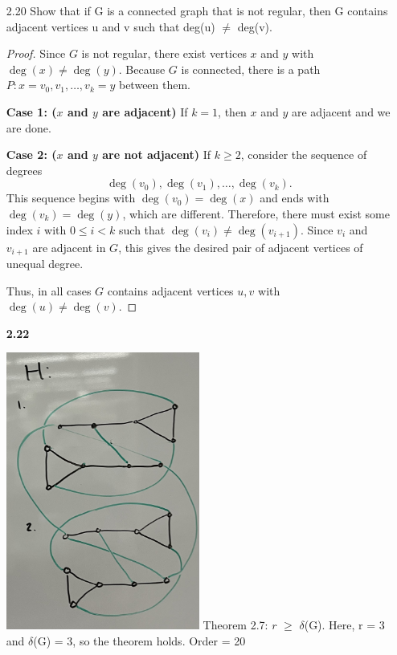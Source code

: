 \documentclass[12pt]{article}
\begin{document}
\begin{enumerate}
\item[2.20]  Show that if G is a connected graph that is not regular, then G contains adjacent vertices
 u and v such that deg(u) $\neq$ deg(v).
\begin{proof}
Since $G$ is not regular, there exist vertices $x$ and $y$ with $\deg(x) \neq \deg(y)$.
Because $G$ is connected, there is a path $P : x=v_0,v_1,\dots,v_k=y$ between them. 

\textbf{Case 1: ($x$ and $y$ are adjacent)} If $k=1$, then $x$ and $y$ are adjacent and we are done. 


\textbf{Case 2: ($x$ and $y$ are not adjacent)} If $k \geq 2$, consider the sequence of degrees
\[
\deg(v_0), \deg(v_1), \dots, \deg(v_k).
\]
This sequence begins with $\deg(v_0)=\deg(x)$ and ends with $\deg(v_k)=\deg(y)$, which are different. 
Therefore, there must exist some index $i$ with $0 \leq i < k$ such that $\deg(v_i) \neq \deg(v_{i+1})$. 
Since $v_i$ and $v_{i+1}$ are adjacent in $G$, this gives the desired pair of adjacent vertices of unequal degree.

Thus, in all cases $G$ contains adjacent vertices $u,v$ with $\deg(u)\neq\deg(v)$.
\end{proof}

\noindent\textbf{2.22}
\begin{center}
    \includegraphics[width=0.5\textwidth]{IMG_1782.jpg}
    \newline
    Theorem 2.7: $r$ $\geq$ $\delta$(G). Here, r = 3 and $\delta$(G) = 3, so the theorem holds.
    Order = 20
\end{center}


\end{enumerate}
\end{document}
